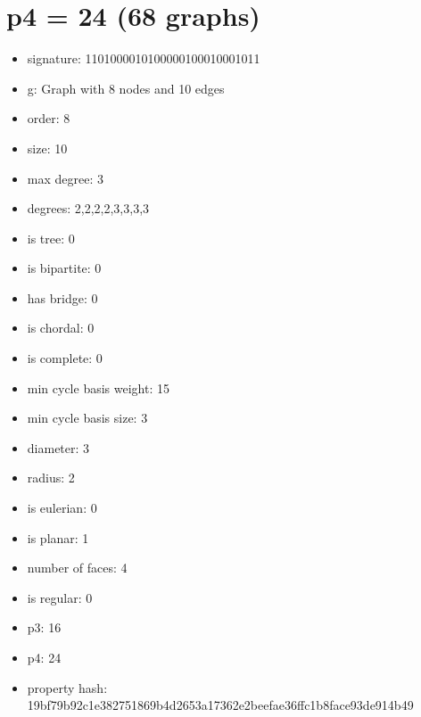 \chapter{p4 = 24 (68 graphs)}
\newpage\begin{figure}
\end{figure}
\begin{itemize}
\item signature: 1101000010100000100010001011
\item g: Graph with 8 nodes and 10 edges
\item order: 8
\item size: 10
\item max degree: 3
\item degrees: 2,2,2,2,3,3,3,3
\item is tree: 0
\item is bipartite: 0
\item has bridge: 0
\item is chordal: 0
\item is complete: 0
\item min cycle basis weight: 15
\item min cycle basis size: 3
\item diameter: 3
\item radius: 2
\item is eulerian: 0
\item is planar: 1
\item number of faces: 4
\item is regular: 0
\item p3: 16
\item p4: 24
\item property hash: 19bf79b92c1e382751869b4d2653a17362e2beefae36ffc1b8face93de914b49
\end{itemize}
